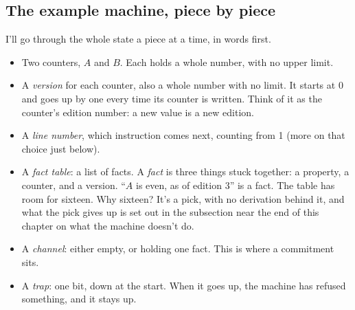 \documentclass[11pt,twoside]{article}
\theoremstyle{thielethm}
\theoremstyle{thieledef}
\theoremstyle{thieledef}
\theoremstyle{thieledef}
\theoremstyle{thielethm}
\theoremstyle{thieleobs}
\theoremstyle{thielethm}
\begin{document}
\subsection{The example machine, piece by piece}

I'll go through the whole state a piece at a time, in words first.

\begin{itemize}
\item Two counters, $A$ and $B$. Each holds a whole number, with no upper limit.
\item A \emph{version} for each counter, also a whole number with no limit. It starts at 0 and goes
up by one every time its counter is written. Think of it as the counter's edition number:
a new value is a new edition.
\item A \emph{line number}, which instruction comes next, counting from 1
(more on that choice just below).
\item A \emph{fact table}: a list of facts. A \emph{fact} is three things stuck together: a property, a
counter, and a version. ``$A$ is even, as of edition 3'' is a fact. The table has room for
sixteen. Why sixteen? It's a pick, with no derivation behind it, and what the pick gives up is set out
in the subsection near the end of this chapter on what the machine doesn't do.
\item A \emph{channel}: either empty, or holding one fact. This is where a commitment sits.
\item A \emph{trap}: one bit, down at the start. When it goes up, the machine has refused something,
and it stays up.
\end{itemize}
\end{document}
